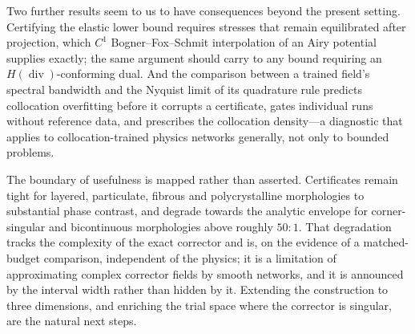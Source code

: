 \documentclass[11pt]{article}
\begin{document}
Two further results seem to us to have consequences beyond the present
setting. Certifying the elastic lower bound requires stresses that remain
equilibrated after projection, which $C^1$ Bogner--Fox--Schmit
interpolation of an Airy potential supplies exactly; the same argument
should carry to any bound requiring an $H(\operatorname{div})$-conforming
dual. And the comparison between a trained field's spectral bandwidth and
the Nyquist limit of its quadrature rule predicts collocation overfitting
before it corrupts a certificate, gates individual runs without reference
data, and prescribes the collocation density---a diagnostic that applies to
collocation-trained physics networks generally, not only to bounded
problems.

The boundary of usefulness is mapped rather than asserted. Certificates
remain tight for layered, particulate, fibrous and polycrystalline
morphologies to substantial phase contrast, and degrade towards the
analytic envelope for corner-singular and bicontinuous morphologies above
roughly $50{:}1$. That degradation tracks the complexity of the exact
corrector and is, on the evidence of a matched-budget comparison,
independent of the physics; it is a limitation of approximating complex
corrector fields by smooth networks, and it is announced by the interval
width rather than hidden by it. Extending the construction to three
dimensions, and enriching the trial space where the corrector is singular,
are the natural next steps.



\end{document}
